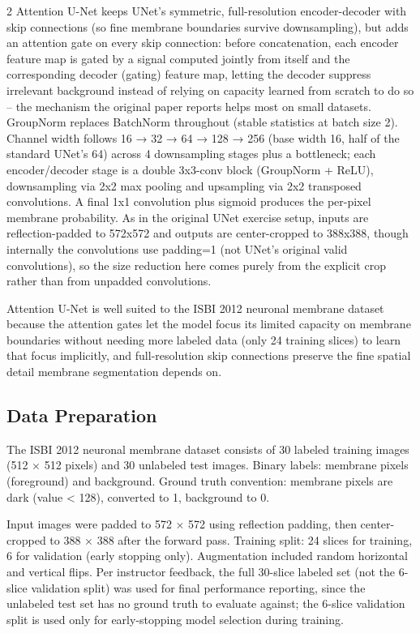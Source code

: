 ﻿\documentclass[a4paper,10pt]{article}
\begin{document}
\begin{multicols*}{2}
Attention U-Net keeps UNet's symmetric, full-resolution encoder-decoder with skip connections (so fine membrane boundaries survive downsampling), but adds an attention gate on every skip connection: before concatenation, each encoder feature map is gated by a signal computed jointly from itself and the corresponding decoder (gating) feature map, letting the decoder suppress irrelevant background instead of relying on capacity learned from scratch to do so -- the mechanism the original paper reports helps most on small datasets. GroupNorm replaces BatchNorm throughout (stable statistics at batch size 2). Channel width follows 16 → 32 → 64 → 128 → 256 (base width 16, half of the standard UNet's 64) across 4 downsampling stages plus a bottleneck; each encoder/decoder stage is a double 3x3-conv block (GroupNorm + ReLU), downsampling via 2x2 max pooling and upsampling via 2x2 transposed convolutions. A final 1x1 convolution plus sigmoid produces the per-pixel membrane probability. As in the original UNet exercise setup, inputs are reflection-padded to 572x572 and outputs are center-cropped to 388x388, though internally the convolutions use padding=1 (not UNet's original valid convolutions), so the size reduction here comes purely from the explicit crop rather than from unpadded convolutions.

Attention U-Net is well suited to the ISBI 2012 neuronal membrane dataset because the attention gates let the model focus its limited capacity on membrane boundaries without needing more labeled data (only 24 training slices) to learn that focus implicitly, and full-resolution skip connections preserve the fine spatial detail membrane segmentation depends on.

\subsection{Data Preparation}
The ISBI 2012 neuronal membrane dataset consists of 30 labeled training images (512 × 512 pixels) and 30 unlabeled test images. Binary labels: membrane pixels (foreground) and background. Ground truth convention: membrane pixels are dark (value < 128), converted to 1, background to 0.

Input images were padded to 572 × 572 using reflection padding, then center-cropped to 388 × 388 after the forward pass. Training split: 24 slices for training, 6 for validation (early stopping only). Augmentation included random horizontal and vertical flips. Per instructor feedback, the full 30-slice labeled set (not the 6-slice validation split) was used for final performance reporting, since the unlabeled test set has no ground truth to evaluate against; the 6-slice validation split is used only for early-stopping model selection during training.


\end{multicols*}
\end{document}
